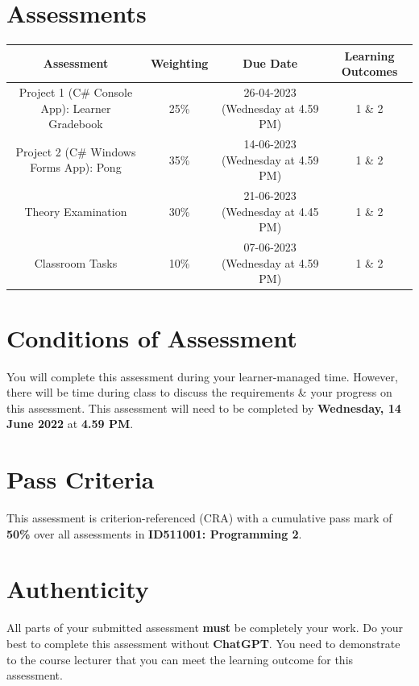 \documentclass{article}
\begin{document}
\section*{Assessments}
\renewcommand{\arraystretch}{1.5}
\begin{tabular}{|c|c|c|c|}
	\hline
	\textbf{Assessment}                                 & \textbf{Weighting} & \textbf{Due Date}            & \textbf{Learning Outcomes} \\ \hline
	\small Project 1 (C\# Console App): Learner Gradebook  & \small 25\%        & \small 26-04-2023 (Wednesday at 4.59 PM)   & \small 1 \& 2                   \\ \hline
	\small Project 2 (C\# Windows Forms App): Pong & \small 35\%        & \small 14-06-2023 (Wednesday at 4.59 PM)   & \small 1 \& 2                   \\ \hline
	\small Theory Examination                        & \small 30\%        & \small 21-06-2023 (Wednesday at 4.45 PM)  & \small 1 \& 2                   \\ \hline
	\small Classroom Tasks                       & \small 10\%        & \small 07-06-2023 (Wednesday at 4.59 PM)  & \small 1 \& 2                   \\ \hline
\end{tabular} 

\section*{Conditions of Assessment}
You will complete this assessment during your learner-managed time. However, there will be time during class to discuss the requirements \& your progress on this assessment. This assessment will need to be completed by \textbf{Wednesday, 14 June 2022} at \textbf{4.59 PM}.

\section*{Pass Criteria}
This assessment is criterion-referenced (CRA) with a cumulative pass mark of \textbf{50\%} over all assessments in \textbf{ID511001: Programming 2}.

\section*{Authenticity}
All parts of your submitted assessment \textbf{must} be completely your work. Do your best to complete this assessment without \textbf{ChatGPT}. You need to demonstrate to the course lecturer that you can meet the learning outcome for this assessment. \\
 
\end{document}
